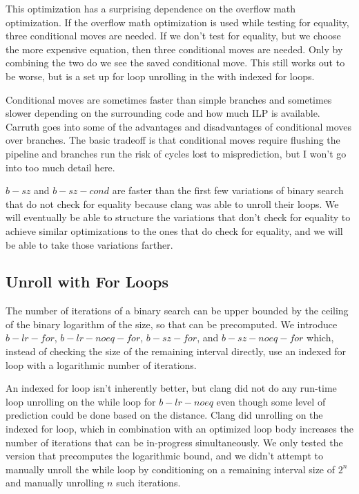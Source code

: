 \documentclass[twocolumn]{article}
\begin{document}
This optimization has a surprising dependence on the overflow math optimization. If the overflow math optimization is used while testing for equality, three conditional moves are needed. If we don't test for equality, but we choose the more expensive equation, then three conditional moves are needed. Only by combining the two do we see the saved conditional move. This still works out to be worse, but is a set up for loop unrolling in the with indexed for loops.

Conditional moves are sometimes faster than simple branches and sometimes slower depending on the surrounding code and how much ILP is available. Carruth \cite{carruth} goes into some of the advantages and disadvantages of conditional moves over branches. The basic tradeoff is that conditional moves require flushing the pipeline and branches run the risk of cycles lost to misprediction, but I won't go into too much detail here.

$b-sz$ and $b-sz-cond$ are faster than the first few variations of binary search that do not check for equality because clang was able to unroll their loops. We will eventually be able to structure the variations that don't check for equality to achieve similar optimizations to the ones that do check for equality, and we will be able to take those variations farther.

\subsection{Unroll with For Loops}
The number of iterations of a binary search can be upper bounded by the ceiling of the binary logarithm of the size, so that can be precomputed. We introduce $b-lr-for$, $b-lr-noeq-for$, $b-sz-for$, and $b-sz-noeq-for$ which, instead of checking the size of the remaining interval directly, use an indexed for loop with a logarithmic number of iterations.

An indexed for loop isn't inherently better, but clang did not do any run-time loop unrolling on the while loop for $b-lr-noeq$ even though some level of prediction could be done based on the distance. Clang did unrolling on the indexed for loop, which in combination with an optimized loop body increases the number of iterations that can be in-progress simultaneously. We only tested the version that precomputes the logarithmic bound, and we didn't attempt to manually unroll the while loop by conditioning on a remaining interval size of $2^n$ and manually unrolling $n$ such iterations.
\end{document}
